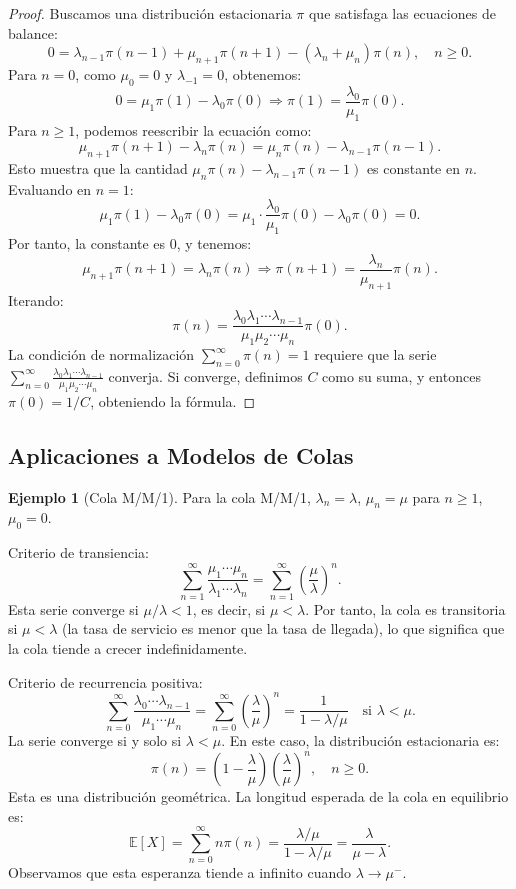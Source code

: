 \documentclass{article}
\theoremstyle{plain}
\theoremstyle{definition}
\newtheorem{Ejemplo}[Teorema]{Ejemplo}
\newcommand{\E}{\mathbb{E}}
\begin{document}
\begin{proof}
  Buscamos una distribuci\'on estacionaria $\pi$ que satisfaga las ecuaciones de balance:
  \[ 0 = \lambda_{n-1} \pi(n-1) + \mu_{n+1} \pi(n+1) - (\lambda_n + \mu_n) \pi(n), \quad n \geq 0. \]
  Para $n=0$, como $\mu_0 = 0$ y $\lambda_{-1}=0$, obtenemos:
  \[ 0 = \mu_1 \pi(1) - \lambda_0 \pi(0) \Rightarrow \pi(1) = \frac{\lambda_0}{\mu_1} \pi(0). \]
  Para $n \geq 1$, podemos reescribir la ecuaci\'on como:
  \[ \mu_{n+1} \pi(n+1) - \lambda_n \pi(n) = \mu_n \pi(n) - \lambda_{n-1} \pi(n-1). \]
  Esto muestra que la cantidad $\mu_n \pi(n) - \lambda_{n-1} \pi(n-1)$ es constante en $n$. Evaluando en $n=1$:
  \[ \mu_1 \pi(1) - \lambda_0 \pi(0) = \mu_1 \cdot \frac{\lambda_0}{\mu_1} \pi(0) - \lambda_0 \pi(0) = 0. \]
  Por tanto, la constante es 0, y tenemos:
  \[ \mu_{n+1} \pi(n+1) = \lambda_n \pi(n) \Rightarrow \pi(n+1) = \frac{\lambda_n}{\mu_{n+1}} \pi(n). \]
  Iterando:
  \[ \pi(n) = \frac{\lambda_0 \lambda_1 \cdots \lambda_{n-1}}{\mu_1 \mu_2 \cdots \mu_n} \pi(0). \]
  La condici\'on de normalizaci\'on $\sum_{n=0}^\infty \pi(n) = 1$ requiere que la serie $\sum_{n=0}^\infty \frac{\lambda_0 \lambda_1 \cdots \lambda_{n-1}}{\mu_1 \mu_2 \cdots \mu_n}$ converja. Si converge, definimos $C$ como su suma, y entonces $\pi(0) = 1/C$, obteniendo la f\'ormula.
\end{proof}

\subsection{Aplicaciones a Modelos de Colas}

\begin{Ejemplo}[Cola M/M/1]
  Para la cola M/M/1, $\lambda_n = \lambda$, $\mu_n = \mu$ para $n \geq 1$, $\mu_0 = 0$.
  
  Criterio de transiencia:
  \[ \sum_{n=1}^\infty \frac{\mu_1 \cdots \mu_n}{\lambda_1 \cdots \lambda_n} = \sum_{n=1}^\infty \left(\frac{\mu}{\lambda}\right)^n. \]
  Esta serie converge si $\mu/\lambda < 1$, es decir, si $\mu < \lambda$. Por tanto, la cola es transitoria si $\mu < \lambda$ (la tasa de servicio es menor que la tasa de llegada), lo que significa que la cola tiende a crecer indefinidamente.
  
  Criterio de recurrencia positiva:
  \[ \sum_{n=0}^\infty \frac{\lambda_0 \cdots \lambda_{n-1}}{\mu_1 \cdots \mu_n} = \sum_{n=0}^\infty \left(\frac{\lambda}{\mu}\right)^n = \frac{1}{1 - \lambda/\mu} \quad \text{si } \lambda < \mu. \]
  La serie converge si y solo si $\lambda < \mu$. En este caso, la distribuci\'on estacionaria es:
  \[ \pi(n) = \left(1 - \frac{\lambda}{\mu}\right) \left(\frac{\lambda}{\mu}\right)^n, \quad n \geq 0. \]
  Esta es una distribuci\'on geom\'etrica. La longitud esperada de la cola en equilibrio es:
  \[ \E[X] = \sum_{n=0}^\infty n \pi(n) = \frac{\lambda/\mu}{1 - \lambda/\mu} = \frac{\lambda}{\mu - \lambda}. \]
  Observamos que esta esperanza tiende a infinito cuando $\lambda \to \mu^-$.
\end{Ejemplo}
\end{document}

